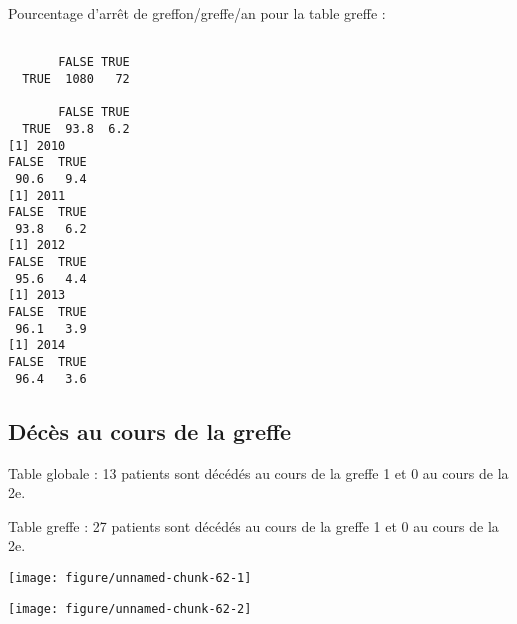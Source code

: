 \documentclass[11pt,a4paper]{article}\usepackage[]{graphicx}\usepackage[]{color}
\makeatletter
\def\maxwidth{ %
  \ifdim\Gin@nat@width>\linewidth
    \linewidth
  \else
    \Gin@nat@width
  \fi
}
\newenvironment{kframe}{%
 \def\at@end@of@kframe{}%
 \ifinner\ifhmode%
  \def\at@end@of@kframe{\end{minipage}}%
  \begin{minipage}{\columnwidth}%
 \fi\fi%
 \def\FrameCommand##1{\hskip\@totalleftmargin \hskip-\fboxsep
 \colorbox{shadecolor}{##1}\hskip-\fboxsep
     \hskip-\linewidth \hskip-\@totalleftmargin \hskip\columnwidth}%
 \MakeFramed {\advance\hsize-\width
   \@totalleftmargin\z@ \linewidth\hsize
   \@setminipage}}%
 {\par\unskip\endMakeFramed%
 \at@end@of@kframe}
\newenvironment{knitrout}{}{} %
\makeatother
\begin{document}
Pourcentage d'arrêt de greffon/greffe/an pour la table greffe :

\begin{knitrout}
\color{fgcolor}\begin{kframe}
\begin{verbatim}
      
       FALSE TRUE
  TRUE  1080   72
      
       FALSE TRUE
  TRUE  93.8  6.2
[1] 2010
FALSE  TRUE 
 90.6   9.4 
[1] 2011
FALSE  TRUE 
 93.8   6.2 
[1] 2012
FALSE  TRUE 
 95.6   4.4 
[1] 2013
FALSE  TRUE 
 96.1   3.9 
[1] 2014
FALSE  TRUE 
 96.4   3.6 
\end{verbatim}
\end{kframe}
\end{knitrout}

  \subsection{Décès au cours de la greffe}

Table globale : 13 patients sont décédés au cours de la greffe 1 et 0 au cours de la 2e.

Table greffe : 27 patients sont décédés au cours de la greffe 1 et 0 au cours de la 2e.

\begin{knitrout}
\color{fgcolor}
\texttt{[image: figure/unnamed-chunk-62-1]} 

\texttt{[image: figure/unnamed-chunk-62-2]} 

\end{knitrout}
\end{document}
